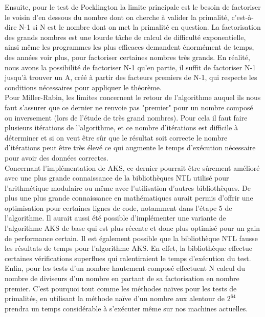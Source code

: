 		Ensuite, pour le test de Pocklington la limite principale est le besoin de factoriser le voisin d’en dessous du nombre dont on cherche à valider la primalité, c’est-à-dire N-1 si N est le nombre dont on met la primalité en question. La factorisation des grands nombres est une lourde tâche de calcul de difficulté exponentielle, ainsi même les programmes les plus efficaces demandent énormément de temps, des années voir plus, pour factoriser certaines nombres très grands.
En réalité, nous avons la possibilité de factoriser N-1 qu’en partie, il suffit de factoriser N-1 jusqu’à trouver un A, créé à partir des facteurs premiers de N-1, qui respecte les conditions nécessaires pour appliquer le théorème.\\

		Pour Miller-Rabin, les limites concernent le retour de l'algorithme auquel ils nous faut s'assurer que ce dernier ne renvoie pas "premier" pour un nombre composé ou inversement (lors de l'étude de très grand nombres). Pour cela il faut faire plusieurs itérations de l'algorithme, et ce nombre d'itérations est difficile à déterminer et si on veut être sûr que le résultat soit correcte le nombre d'itérations peut être très élevé ce qui augmente le temps d'exécution nécessaire pour avoir des données correctes.\\	
		
		Concernant l'implémentation de AKS, ce dernier pourrait être sûrement amélioré avec une plus grande connaissance de la bibliothèques NTL utilisé pour l'arithmétique modulaire ou même avec l'utilisation d'autres bibliothèques. De plus une plus grande connaissance en mathématiques aurait permis d'offrir une optimisation pour certaines lignes de code, notamment dans l'étape 5 de l’algorithme. Il aurait aussi été possible d'implémenter une variante de l’algorithme AKS de base qui est plus récente et donc plus optimisé pour un gain de performance certain.
Il est également possible que la bibliothèque NTL fausse les résultats de temps pour l'algorithme AKS. En effet, la bibliothèque effectue certaines vérifications superflues qui ralentiraient le temps d’exécution du test.\\
		
		Enfin, pour les tests d'un nombre hautement composé effectuent N calcul du nombre de diviseurs d'un nombre en partant de sa factorisation en nombre premier. C'est pourquoi tout comme les méthodes naïves pour les tests de primalités, en utilisant la méthode naïve d'un nombre aux alentour de $2^{64}$ prendra un temps considérable à s’exécuter même sur nos machines actuelles.
					
